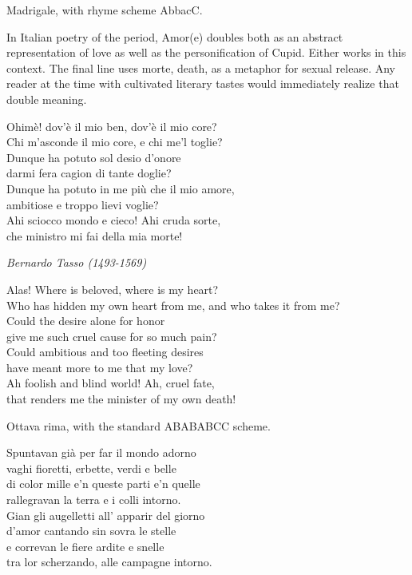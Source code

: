 \documentclass[12pt, twocolumn]{text-translation}
\begin{document}
Madrigale, with rhyme scheme AbbacC.

In Italian poetry of the period, Amor(e) doubles both as an abstract
representation of love as well as the personification of Cupid. Either
works in this context. The final line uses morte, death, as a metaphor
for sexual release. Any reader at the time with cultivated literary tastes would
immediately realize that double meaning.

Ohimè! dov'è il mio ben, dov'è il mio core?  \\
Chi m'asconde il mio core, e chi me'l toglie?  \\
Dunque ha potuto sol desio d'onore  \\
darmi fera cagion di tante doglie?  \\
Dunque ha potuto in me più che il mio amore,  \\
ambitiose e troppo lievi voglie?  \\
Ahi sciocco mondo e cieco! Ahi cruda sorte,  \\
che ministro mi fai della mia morte!  

{\raggedleft \textit{Bernardo Tasso (1493-1569)}\par}

\poemasterisks
Alas! Where is beloved, where is my heart? \\
Who has hidden my own heart from me, and who takes it from me? \\
Could the desire alone for honor \\
give me such cruel cause for so much pain? \\
Could ambitious and too fleeting desires \\
have meant more to me that my love? \\
Ah foolish and blind world! Ah, cruel fate, \\
that renders me the minister of my own death!

Ottava rima, with the standard ABABABCC scheme.

Spuntavan già per far il mondo adorno \\
vaghi fioretti, erbette, verdi e belle \\
di color mille e'n queste parti e'n quelle \\
rallegravan la terra e i colli intorno. \\
Gian gli augelletti all' apparir del giorno \\
d'amor cantando sin sovra le stelle \\
e correvan le fiere ardite e snelle \\
tra lor scherzando, alle campagne intorno. \\
\end{document}
